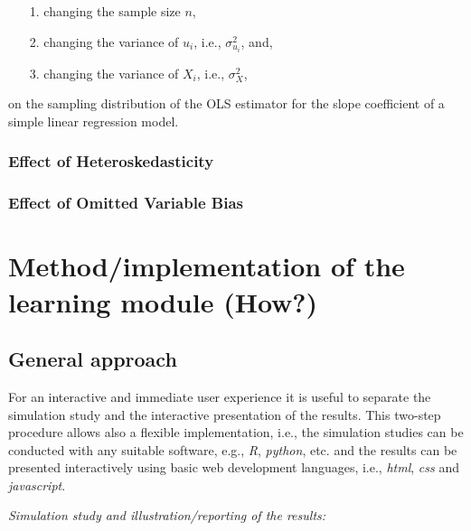 \documentclass{article}
\begin{document}
\begin{itemize}
	\item[1.] changing the sample size $n$,
	\item[2.] changing the variance of $u_{i}$, i.e., $\sigma_{u_{i}}^{2}$, and,
	\item[3.] changing the variance of $X_{i}$, i.e., $\sigma_{X}^{2}$, 
\end{itemize}

on the sampling distribution of the OLS estimator for the slope coefficient of a simple linear regression model.

\subsubsection{Effect of Heteroskedasticity}


\subsubsection{Effect of Omitted Variable Bias}






\section{Method/implementation of the learning module (How?)}

\subsection{General approach}

For an interactive and immediate user experience it is useful to separate the simulation study and the interactive presentation of the results. 
%
This two-step procedure allows also a flexible implementation, i.e., the simulation studies can be conducted with any suitable software, e.g., \emph{R}, \emph{python}, etc. and the results can be presented interactively using basic web development languages, i.e., \emph{html}, \emph{css} and \emph{javascript}.

\emph{Simulation study and illustration/reporting of the results:}
\end{document}
